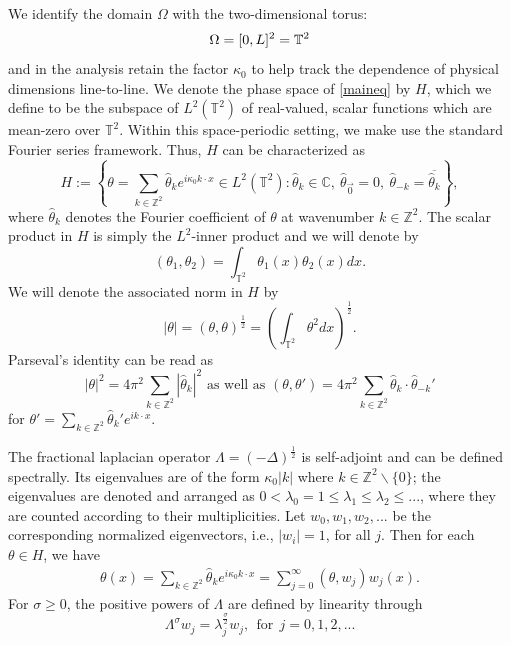 \documentclass[twoside, reqno]{amsart}
\numberwithin{lemma}{section}
\numberwithin{theorem}{section}
\numberwithin{proposition}{section}
\numberwithin{equation}{section} %
\newcommand{\te}{\theta}
\newcommand{\la}{\Lambda}
\newcommand{\zz}{\mathbb{Z}^2}
\newcommand{\C}{\mathbb{C}}
\newcommand{\TT}{\mathbb{T}}
\newcommand{\ZZ}{\mathbb{Z}}
\newcommand{\kap}{\kappa}
\newcommand{\Om}{\Omega}
\newcommand{\tht}{\theta}
\begin{document}
We identify the domain $\Om$ with the two-dimensional torus:
    \begin{align}\notag
        \Omega=[0,L]^2=\TT^2
    \end{align}
and in the analysis retain the factor $\kap_0$ to help track the dependence of physical dimensions line-to-line. 
 We denote the phase space of \eqref{maineq} by $H$, which we define to be the subspace of $L^2(\TT^2)$ of real-valued, scalar functions which are mean-zero over $\TT^2$. Within this space-periodic setting, we make use the {standard Fourier series framework}. Thus, $H$ can be characterized as
\begin{equation*}
    H := \left\{ \te = \sum_{k\in \zz} \hat{\te}_k e^{i{\kap_0}k\cdot x} \in L^2(\TT^2): \hat{\te}_k \in \C,\  \hat{\te}_{\vec{0}} = 0,\ \hat{\te}_{-k} = \overline{\hat{\te}_k} \right\},
\end{equation*}
where $\hat{\te}_k$ denotes the Fourier coefficient of $\tht$ at wavenumber $k\in\ZZ^2$. The scalar product in $H$ is simply the $L^2$-inner product and we will denote by
\begin{equation*}
    (\te_1,\te_2) = \int_{\TT^2} \te_1(x)\te_2(x)dx.
\end{equation*}
We will denote the associated norm in $H$ by
\begin{equation*}
    |\te| = (\te,\te)^{\frac{1}{2}} = \left(\int_{\TT^2} \te^2dx\right)^{\frac{1}{2}} .
\end{equation*}
Parseval's identity can be read as
\begin{equation*}
   {|\te|}^2 = 4\pi^2 \sum_{k \in \zz} |{\hat{\te}_{k}}|^2 \text{ as well as } (\te,\te')=4\pi^2 \sum_{k \in \zz} {\hat{\te}_{k}} \cdot {\hat{\te}_{-k}'}
\end{equation*}
for $ \te'  =\sum_{k\in \zz} {\hat{\te}_{k}'}e^{ik\cdot x}$. 

The fractional laplacian operator $\la=(-\Delta)^{\frac{1}{2}}$ is self-adjoint and can be defined spectrally. Its eigenvalues are of the form ${\kap_0}|k|$ where $ k \in \zz \backslash \{0\} $; the eigenvalues are denoted and arranged as $0<\lambda_0 = 1 \leq \lambda_1 \leq \lambda_2 \leq ...$, where they are counted according to their multiplicities. Let $w_0,w_1,w_2,...$ be the corresponding normalized eigenvectors, i.e., $|w_i|=1$, for all $j$. {Then for each $\tht\in H$, we have}
    \begin{align*}
        {\tht(x)=\sum_{k\in\ZZ^2}\hat{\tht}_ke^{i\kap_0k\cdotp x}=\sum_{j=0}^\infty (\tht,w_j)w_j(x).}
    \end{align*}
For $\sigma \ge 0$, the {positive powers} of $\la$ are defined by linearity through
\begin{equation*}
    \la^{\sigma}w_j = \lambda_j^{\frac{\sigma}{2}}w_j, \ \ \textrm{for} \ \ j=0,1,2,...
\end{equation*}
\end{document}
